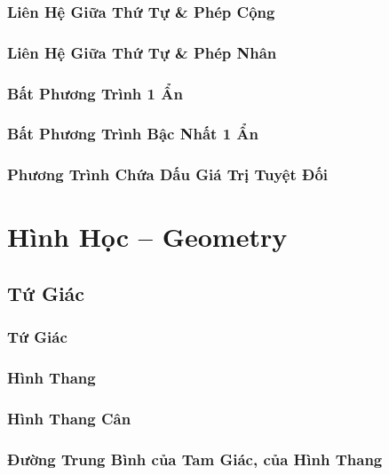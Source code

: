 \documentclass[oneside]{book}
\numberwithin{equation}{section}
\begin{document}
\section{Liên Hệ Giữa Thứ Tự \& Phép Cộng}

\section{Liên Hệ Giữa Thứ Tự \& Phép Nhân}

\section{Bất Phương Trình 1 Ẩn}

\section{Bất Phương Trình Bậc Nhất 1 Ẩn}

\section{Phương Trình Chứa Dấu Giá Trị Tuyệt Đối}


\part{Hình Học -- Geometry}

\chapter{Tứ Giác}

\section{Tứ Giác}

\section{Hình Thang}

\section{Hình Thang Cân}

\section{Đường Trung Bình của Tam Giác, của Hình Thang}
\end{document}
